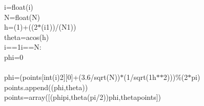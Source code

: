 {{\begin{tabbing}
\hspace{72pt}i\hspace{6pt}=\hspace{6pt}float(i)\\
\hspace{72pt}N\hspace{6pt}=\hspace{6pt}float(N)\\
\hspace{72pt}h\hspace{6pt}=\hspace{6pt}(\dash{}1)+((2$\ast$(i\dash{}1))\hspace{6pt}/\hspace{6pt}(N\dash{}1))\\
\hspace{72pt}theta\hspace{6pt}=\hspace{6pt}acos(h)\\
\hspace{6pt}i\hspace{6pt}==\hspace{6pt}1\hspace{6pt}i\hspace{6pt}==\hspace{6pt}N:\\
\hspace{96pt}phi\hspace{6pt}=\hspace{6pt}0\\
\\
\hspace{96pt}phi\hspace{6pt}=\hspace{6pt}(points{[}int(i)\dash{}2{]}{[}0{]}\hspace{6pt}+\hspace{6pt}(3.6/sqrt(N))\hspace{6pt}$\ast$\hspace{6pt}(1/sqrt(1\dash{}h$\ast$$\ast$2))\hspace{6pt})\hspace{6pt}\%\hspace{6pt}(2$\ast$pi)\\
\hspace{72pt}points.append((phi,theta))\\
\hspace{48pt}points\hspace{6pt}=\hspace{6pt}array({[}(phi\dash{}pi,theta\dash{}(pi/2))\hspace{6pt}phi,theta\hspace{6pt}points{]})\\
$$
\end{tabbing}}}
